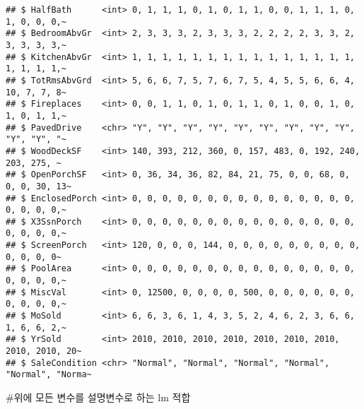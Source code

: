 \documentclass[
]{article}
\begin{document}
\begin{verbatim}
## $ HalfBath      <int> 0, 1, 1, 1, 0, 1, 0, 1, 1, 0, 0, 1, 1, 1, 0, 1, 0, 0, 0,~
## $ BedroomAbvGr  <int> 2, 3, 3, 3, 2, 3, 3, 3, 2, 2, 2, 2, 3, 3, 2, 3, 3, 3, 3,~
## $ KitchenAbvGr  <int> 1, 1, 1, 1, 1, 1, 1, 1, 1, 1, 1, 1, 1, 1, 1, 1, 1, 1, 1,~
## $ TotRmsAbvGrd  <int> 5, 6, 6, 7, 5, 7, 6, 7, 5, 4, 5, 5, 6, 6, 4, 10, 7, 7, 8~
## $ Fireplaces    <int> 0, 0, 1, 1, 0, 1, 0, 1, 1, 0, 1, 0, 0, 1, 0, 1, 0, 1, 1,~
## $ PavedDrive    <chr> "Y", "Y", "Y", "Y", "Y", "Y", "Y", "Y", "Y", "Y", "Y", "~
## $ WoodDeckSF    <int> 140, 393, 212, 360, 0, 157, 483, 0, 192, 240, 203, 275, ~
## $ OpenPorchSF   <int> 0, 36, 34, 36, 82, 84, 21, 75, 0, 0, 68, 0, 0, 0, 30, 13~
## $ EnclosedPorch <int> 0, 0, 0, 0, 0, 0, 0, 0, 0, 0, 0, 0, 0, 0, 0, 0, 0, 0, 0,~
## $ X3SsnPorch    <int> 0, 0, 0, 0, 0, 0, 0, 0, 0, 0, 0, 0, 0, 0, 0, 0, 0, 0, 0,~
## $ ScreenPorch   <int> 120, 0, 0, 0, 144, 0, 0, 0, 0, 0, 0, 0, 0, 0, 0, 0, 0, 0~
## $ PoolArea      <int> 0, 0, 0, 0, 0, 0, 0, 0, 0, 0, 0, 0, 0, 0, 0, 0, 0, 0, 0,~
## $ MiscVal       <int> 0, 12500, 0, 0, 0, 0, 500, 0, 0, 0, 0, 0, 0, 0, 0, 0, 0,~
## $ MoSold        <int> 6, 6, 3, 6, 1, 4, 3, 5, 2, 4, 6, 2, 3, 6, 6, 1, 6, 6, 2,~
## $ YrSold        <int> 2010, 2010, 2010, 2010, 2010, 2010, 2010, 2010, 2010, 20~
## $ SaleCondition <chr> "Normal", "Normal", "Normal", "Normal", "Normal", "Norma~
\end{verbatim}

\#위에 모든 변수를 설명변수로 하는 lm 적합
\end{document}
